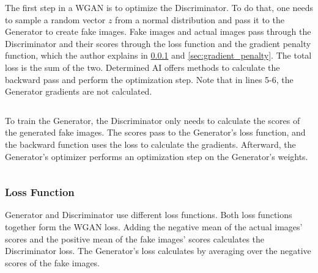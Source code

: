 \begin{listing}[H]
\inputminted{python}{resources/codes/train_batch.py}
\end{listing}

The first step in a WGAN is to optimize the Discriminator. To do that, one needs to sample a  random vector $ z $ from a normal distribution and pass it to the Generator to create fake images. Fake images and actual images pass through the Discriminator and their scores through the loss function and the gradient penalty function, which the author explains in \ref{sec:loss_function} and \ref{sec:gradient_penalty}. The total loss is the sum of the two. Determined AI offers methods to calculate the backward pass and perform the optimization step. Note that in lines 5-6, the Generator gradients are not calculated.  \\

\begin{listing}[H]
\inputminted{python}{resources/codes/optimize_discriminator.py}
\end{listing}

\newpage

To train the Generator, the Discriminator only needs to calculate the scores of the generated fake images. The scores pass to the Generator's loss function, and the backward function uses the loss to calculate the gradients. Afterward, the Generator's optimizer performs an optimization step on the Generator's weights.

\begin{listing}[H]
\inputminted{python}{resources/codes/optimize_generator.py}
\end{listing}

\subsubsection{Loss Function}
\label{sec:loss_function}

Generator and Discriminator use different loss functions. Both loss functions together form the WGAN loss. Adding the negative mean of the actual images' scores and the positive mean of the fake images' scores calculates the Discriminator loss. The Generator's loss calculates by averaging over the negative scores of the fake images.

\begin{listing}[H]
\inputminted{python}{resources/codes/wgan_loss.py}
\end{listing}


